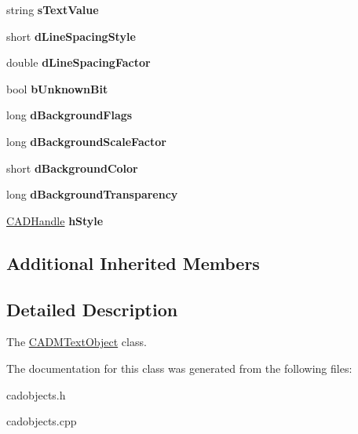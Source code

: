 \begin{DoxyCompactItemize}
\item 
string {\bfseries s\+Text\+Value}\hypertarget{class_c_a_d_m_text_object_a9f924944d10fd0b2fef90dcb4f72a5f3}{}\label{class_c_a_d_m_text_object_a9f924944d10fd0b2fef90dcb4f72a5f3}

\item 
short {\bfseries d\+Line\+Spacing\+Style}\hypertarget{class_c_a_d_m_text_object_af93d432402ad8eac198e1020c6a0092f}{}\label{class_c_a_d_m_text_object_af93d432402ad8eac198e1020c6a0092f}

\item 
double {\bfseries d\+Line\+Spacing\+Factor}\hypertarget{class_c_a_d_m_text_object_a3684f352d80287072c152ba072afd1f4}{}\label{class_c_a_d_m_text_object_a3684f352d80287072c152ba072afd1f4}

\item 
bool {\bfseries b\+Unknown\+Bit}\hypertarget{class_c_a_d_m_text_object_adb504ec2e3fd4e552edbbe9ac932df1c}{}\label{class_c_a_d_m_text_object_adb504ec2e3fd4e552edbbe9ac932df1c}

\item 
long {\bfseries d\+Background\+Flags}\hypertarget{class_c_a_d_m_text_object_ad1015f8d615227c0c5ffe505fe997a47}{}\label{class_c_a_d_m_text_object_ad1015f8d615227c0c5ffe505fe997a47}

\item 
long {\bfseries d\+Background\+Scale\+Factor}\hypertarget{class_c_a_d_m_text_object_afc4d2631c7f82fa62d476303f302c8bb}{}\label{class_c_a_d_m_text_object_afc4d2631c7f82fa62d476303f302c8bb}

\item 
short {\bfseries d\+Background\+Color}\hypertarget{class_c_a_d_m_text_object_af867f24f79e98122a4f3298abd4b8855}{}\label{class_c_a_d_m_text_object_af867f24f79e98122a4f3298abd4b8855}

\item 
long {\bfseries d\+Background\+Transparency}\hypertarget{class_c_a_d_m_text_object_afbcfd1e13d250b1458d75720e747f61e}{}\label{class_c_a_d_m_text_object_afbcfd1e13d250b1458d75720e747f61e}

\item 
\hyperlink{class_c_a_d_handle}{C\+A\+D\+Handle} {\bfseries h\+Style}\hypertarget{class_c_a_d_m_text_object_ab63b8fcdb2852dc4c5a90f30d318fe55}{}\label{class_c_a_d_m_text_object_ab63b8fcdb2852dc4c5a90f30d318fe55}

\end{DoxyCompactItemize}
\subsection*{Additional Inherited Members}


\subsection{Detailed Description}
The \hyperlink{class_c_a_d_m_text_object}{C\+A\+D\+M\+Text\+Object} class. 

The documentation for this class was generated from the following files\+:\begin{DoxyCompactItemize}
\item 
cadobjects.\+h\item 
cadobjects.\+cpp\end{DoxyCompactItemize}
